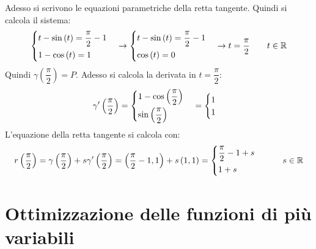 \documentclass[a4paper]{article}
\begin{document}
	Adesso si scrivono le equazioni parametriche della retta tangente. Quindi si calcola il sistema:
	\begin{equation*}
		\begin{cases}
			t-\sin\left(t\right) = \dfrac{\pi}{2}-1 \vspace{.3em} \\
			1-\cos\left(t\right) = 1
		\end{cases}
		\rightarrow
		\begin{cases}
			t-\sin\left(t\right) = \dfrac{\pi}{2}-1 \vspace{.3em} \\
			\cos\left(t\right) = 0
		\end{cases}
		\rightarrow
		t = \dfrac{\pi}{2} \hspace{2em} t \in \mathbb{R}
	\end{equation*}
	Quindi $\gamma\left(\dfrac{\pi}{2}\right) = P$. Adesso si calcola la derivata in $t = \dfrac{\pi}{2}$:
	\begin{equation*}
		\gamma'\left(\dfrac{\pi}{2}\right) 
		= 
		\begin{cases}
			1-\cos\left(\dfrac{\pi}{2}\right) \vspace{.3em}\\
			\sin\left(\dfrac{\pi}{2}\right)
		\end{cases}
		=
		\begin{cases}
			1 \\
			1
		\end{cases}
	\end{equation*}
	L'equazione della retta tangente si calcola con:
	\begin{equation*}
		r\left(\dfrac{\pi}{2}\right) = \gamma\left(\dfrac{\pi}{2}\right) + s\gamma'\left(\dfrac{\pi}{2}\right) = \left(\dfrac{\pi}{2}-1, 1\right) + s\left(1,1\right) =
		\begin{cases}
			\dfrac{\pi}{2}-1 + s \vspace{.3em}\\
			1 + s
		\end{cases}
		\hspace{2em}
		s\in\mathbb{R}
	\end{equation*}\newpage

	\section{Ottimizzazione delle funzioni di più variabili}\label{section: ottimizzazione delle funzioni di più variabili}
\end{document}
